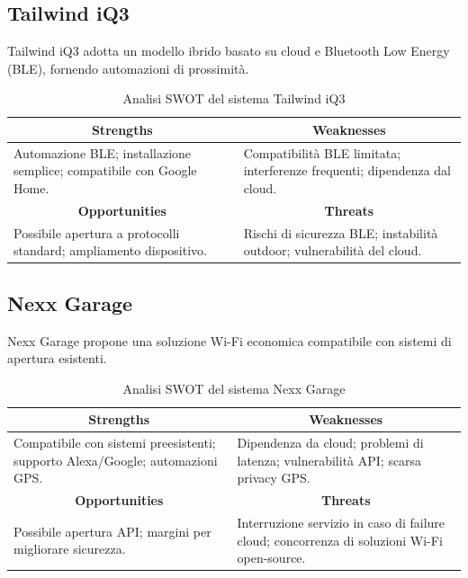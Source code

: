 \subsection{Tailwind iQ3}
Tailwind iQ3 adotta un modello ibrido basato su cloud e Bluetooth Low Energy (BLE), fornendo automazioni di prossimità.

\begin{table}[h!]
\centering
\caption{Analisi SWOT del sistema Tailwind iQ3}
\label{tab:swot_tailwind}
\renewcommand{\arraystretch}{1.4}

\begin{tabular}{|p{}|p{}|}
\hline
\multicolumn{1}{|c|}{\textbf{Strengths}} & 
\multicolumn{1}{c|}{\textbf{Weaknesses}} \\
\hline
Automazione BLE; installazione semplice; compatibile con Google Home. &
Compatibilità BLE limitata; interferenze frequenti; dipendenza dal cloud. \\
\hline

\multicolumn{1}{|c|}{\textbf{Opportunities}} &
\multicolumn{1}{c|}{\textbf{Threats}} \\
\hline
Possibile apertura a protocolli standard; ampliamento dispositivo. &
Rischi di sicurezza BLE; instabilità outdoor; vulnerabilità del cloud. \\
\hline
\end{tabular}

\end{table}


\subsection{Nexx Garage}
Nexx Garage propone una soluzione Wi-Fi economica compatibile con sistemi di apertura esistenti.

\begin{table}[h!]
\centering
\caption{Analisi SWOT del sistema Nexx Garage}
\label{tab:swot_nexx}
\renewcommand{\arraystretch}{1.4}

\begin{tabular}{|p{}|p{}|}
\hline
\multicolumn{1}{|c|}{\textbf{Strengths}} & 
\multicolumn{1}{c|}{\textbf{Weaknesses}} \\
\hline
Compatibile con sistemi preesistenti; supporto Alexa/Google; automazioni GPS. &
Dipendenza da cloud; problemi di latenza; vulnerabilità API; scarsa privacy GPS. \\
\hline

\multicolumn{1}{|c|}{\textbf{Opportunities}} &
\multicolumn{1}{c|}{\textbf{Threats}} \\
\hline
Possibile apertura API; margini per migliorare sicurezza. &
Interruzione servizio in caso di failure cloud; concorrenza di soluzioni Wi-Fi open-source. \\
\hline
\end{tabular}

\end{table}

